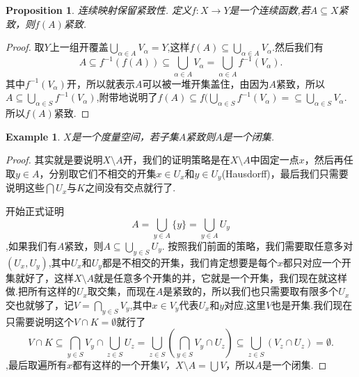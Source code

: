 \documentclass{article}
\newtheorem{proposition}[theorem]{Proposition}
\newtheorem{example}[theorem]{Example}
\newcommand*{\xfunc}[4]{{#2}\colon{#3}{#1}{#4}}
\newcommand*{\func}[3]{\xfunc{\to}{#1}{#2}{#3}}
\begin{document}
\begin{proposition}
连续映射保留紧致性. 定义$\func{f}{X}{Y}$是一个连续函数,若$A \subseteq X$紧致，则$f(A)$紧致.
\end{proposition}

\begin{proof}
取$Y$上一组开覆盖$\bigcup\limits_{\alpha \in A}V_\alpha=Y$,这样$f(A) \subseteq \bigcup\limits_{\alpha \in A}V_\alpha$.然后我们有\[A \subseteq f^{-1}(f(A)) \subseteq \bigcup\limits_{\alpha \in A}V_\alpha = \bigcup\limits_{\alpha \in A} f^{-1}(V_\alpha).\]其中$f^{-1}(V_\alpha)$开，所以就表示$A$可以被一堆开集盖住，由因为$A$紧致，所以$A \subseteq \bigcup\limits_{\alpha \in S} f^{-1}(V_\alpha)$,附带地说明了$f(A) \subseteq f(\bigcup\limits_{\alpha \in S} f^{-1}(V_\alpha) = \subseteq \bigcup\limits_{\alpha \in S} V_\alpha $.所以$f(A)$紧致.
\end{proof}



\begin{example}
$X$是一个度量空间，若子集$A$紧致则$A$是一个闭集.
\end{example}

\begin{proof}
其实就是要说明$X \setminus A$开，我们的证明策略是在$X \setminus A$中固定一点$x$，然后再任取$y \in A$，分别取它们不相交的开集$x \in U_x$和$y \in U_y$(Hausdorff)，最后我们只需要说明这些$\bigcap U_x$与$K$之间没有交点就行了.

开始正式证明\[A = \bigcup\limits_{y \in A} \{y\} = \bigcup\limits_{y \in A}U_y \],如果我们有$A$紧致，则$ A \subseteq \bigcup\limits_{y \in S} U_y$. 按照我们前面的策略，我们需要取任意多对$(U_x,U_y)$,其中$U_x$和$U_y$都是不相交的开集，我们肯定想要是每个$x$都只对应一个开集就好了，这样$X \setminus A$就是任意多个开集的并，它就是一个开集，我们现在就这样做.把所有这样的$U_x$取交集，而现在$A$是紧致的，所以我们也只需要取有限多个$U_x$交也就够了，记$V = \bigcap\limits_{y \in S} V_y$,其中$x \in V_y$代表$U_x$和$y$对应,这里$V$也是开集.我们现在只需要说明这个$V \cap K = \emptyset$就行了\[V \cap K \subseteq \bigcap\limits_{y \in S} V_y \cap \bigcup\limits_{z \in S} U_z = \bigcup\limits_{z \in S}(\bigcap\limits_{y \in S} V_y \cap U_z) \subseteq \bigcup\limits_{z \in S}(V_z \cap U_z) = \emptyset. \],最后取遍所有$x$都有这样的一个开集$V$，$X \setminus A = \bigcup V$，所以$A$是一个闭集.
\end{proof}
\end{document}
